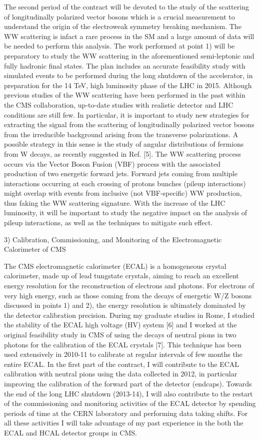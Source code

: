 \documentclass[10pt, a4paper]{article}
\begin{document}
The second period of the contract will be devoted to the study of the scattering of longitudinally polarized vector bosons which is a crucial measurement to understand the origin of the electroweak symmetry breaking mechanism. The WW scattering is infact a rare process in the SM and a large amount of data will be needed to perform this analysis. 
The work performed at point 1) will be preparatory to study the WW scattering in the aforementioned semi-leptonic and fully hadronic final states. The plan includes an accurate feasibility study with simulated events to be performed during the long shutdown of the accelerator, in preparation for the 14 TeV, high luminosity phase of the LHC in 2015. Although previous studies of the WW scattering have been performed in the past within the CMS collaboration, up-to-date studies with realistic detector and LHC conditions are still few. In particular, it is important to study new strategies for extracting the signal from the scattering of longitudinally polarized vector bosons from the irreducible background arising from the transverse polarizations. A possible strategy in this sense is the study of angular distributions of fermions from W decays, as recently suggested in Ref. [5].
The WW scattering process occurs via the Vector Boson Fusion (VBF) process with the associated production of two energetic forward jets. Forward jets coming from multiple interactions occurring at each crossing of protons bunches (pileup interactions) might overlap with events from inclusive (not VBF-specific) WW production, thus faking the WW scattering signature. With the increase of the LHC luminosity, it will be important to study the negative impact on the analysis of pileup interactions, as well as the techniques to mitigate such effect.

3) Calibration, Commissioning, and Monitoring of the Electromagnetic Calorimeter of CMS

The CMS electromagnetic calorimeter (ECAL) is a homogeneous crystal calorimeter, made up of lead tungstate crystals, aiming to reach an excellent energy resolution for the reconstruction of electrons and photons. For electrons of very high energy, such as those coming from the decays of energetic W/Z bosons discussed in points 1) and 2), the energy resolution is ultimately dominated by the detector calibration precision. 
During my graduate studies in Rome, I studied the stability of the ECAL high voltage (HV) system [6] and I worked at the original feasibility study in CMS of using the decays of neutral pions in two photons for the calibration of the ECAL crystals [7].  This technique has been used extensively in 2010-11 to calibrate at regular intervals of few months the entire ECAL.
In the first part of the contract, I will contribute to the ECAL calibration with neutral pions using the data collected in 2012, in particular improving the calibration of the forward part of the detector (endcaps). Towards the end of the long LHC shutdown (2013-14), I will also contribute to the restart of the commissioning and monitoring activities of the ECAL detector by spending periods of time at the CERN laboratory and performing data taking shifts. For all these activities I will take advantage of my past experience in the both the ECAL and HCAL detector groups in CMS.
\end{document}
